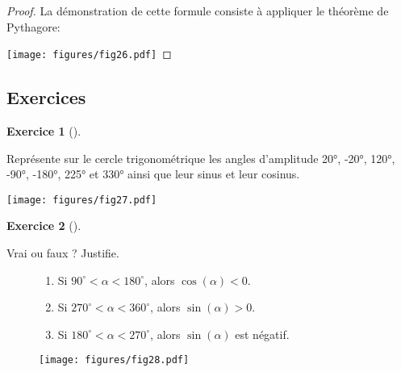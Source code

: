 \documentclass[
  a4paper,
  DIV=11,
  numbers=noendperiod,
  oneside]{scrreprt}
\theoremstyle{definition}
\theoremstyle{definition}
\newtheorem{exercise}{Exercice}[chapter]
\theoremstyle{plain}
\theoremstyle{definition}
\theoremstyle{remark}
\begin{document}
\begin{proof}
La démonstration de cette formule consiste à appliquer le théorème de
Pythagore:

\texttt{[image: figures/fig26.pdf]}
\end{proof}

\newpage{}

\subsection{Exercices}\label{exercices-1}

\begin{exercise}[]\protect\hypertarget{exr-}{}\label{exr-}

Représente sur le cercle trigonométrique les angles d'amplitude 20°,
-20°, 120°, -90°, -180°, 225° et 330° ainsi que leur sinus et leur
cosinus.

\begin{center}
\texttt{[image: figures/fig27.pdf]}
\end{center}

\end{exercise}

\newpage{}

\begin{exercise}[]\protect\hypertarget{exr-}{}\label{exr-}

Vrai ou faux ? Justifie.

\begin{figure}

\begin{minipage}{0.60\linewidth}

\begin{enumerate}
\def\labelenumi{\arabic{enumi})}
\item
  Si \(90^\circ<\alpha <180^\circ\), alors \(\cos(\alpha)<0\).
\item
  Si \(270^\circ<\alpha <360^\circ\), alors \(\sin(\alpha)>0\).
\item
  Si \(180^\circ<\alpha <270^\circ\), alors \(\sin(\alpha)\) est
  négatif.
\end{enumerate}

\end{minipage}%
%
\begin{minipage}{0.40\linewidth}
\begin{center}
\texttt{[image: figures/fig28.pdf]}
\end{center}
\end{minipage}%

\end{figure}%

\end{exercise}
\end{document}
